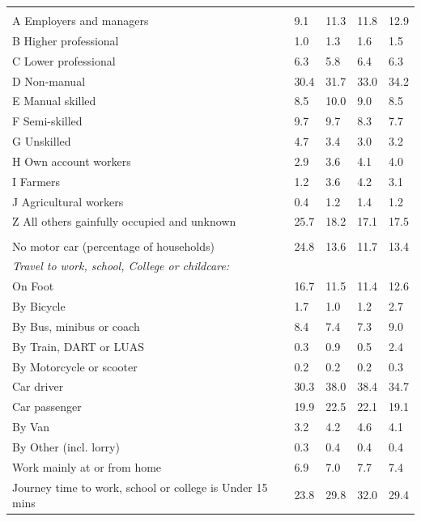 \documentclass{article}
\begin{document}
\begin{table}[h]
\begin{tabular}{KTTTT}
\hline
    \\ 
    \hline
A Employers and managers &  9.1& 11.3& 11.8& 12.9\\
B Higher professional & 1.0& 1.3& 1.6& 1.5\\
C Lower professional & 6.3& 5.8& 6.4& 6.3\\
D Non-manual & 30.4& 31.7& 33.0& 34.2\\
E Manual skilled &  8.5& 10.0&  9.0&  8.5\\
F Semi-skilled & 9.7& 9.7& 8.3& 7.7\\
G Unskilled & 4.7& 3.4& 3.0& 3.2\\
H Own account workers & 2.9& 3.6& 4.1& 4.0\\
I Farmers & 1.2& 3.6& 4.2& 3.1\\
J Agricultural workers & 0.4& 1.2& 1.4& 1.2\\
Z All others gainfully occupied and unknown & 25.7& 18.2& 17.1& 17.5\\
\hline
{}\hline
    \\ 
    \hline
No motor car (percentage of households) & 24.8& 13.6& 11.7& 
13.4\\
    \hline 
\emph{Travel to work, school, College or childcare:} & & & \\
\quad On Foot & 16.7& 11.5& 11.4& 12.6\\ 
\quad By Bicycle & 1.7& 1.0& 1.2& 2.7\\ 
\quad By Bus, minibus or coach & 8.4& 7.4& 7.3& 9.0\\
\quad By Train, DART or LUAS & 0.3& 0.9& 0.5& 2.4\\
\quad By Motorcycle or scooter & 0.2& 0.2& 0.2& 0.3\\
\quad Car driver & 30.3 & 38.0& 38.4& 34.7\\
\quad Car passenger & 19.9& 22.5& 22.1& 19.1\\
\quad By Van & 3.2& 4.2& 4.6& 4.1\\
\quad By Other (incl. lorry) & 0.3& 0.4& 0.4& 0.4\\
    \hline
Work mainly at or from home & 6.9& 7.0& 7.7& 7.4\\
Journey time to work, school or college is Under 15 mins & 23.8& 29.8& 32.0& 29.4\\

\end{tabular}
\end{table}
\end{document}
